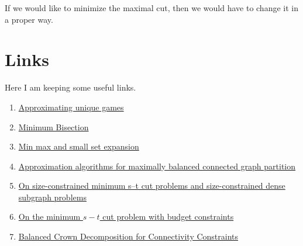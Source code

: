 \documentclass{article}
\theoremstyle{plain}
\theoremstyle{plain}
\theoremstyle{remark}
\begin{document}
	If we would like to minimize the maximal cut, then we would have to change it in a proper way.
	
	\section{Links}
	
	Here I am keeping some useful links.
	
	\begin{enumerate}
		\item \href{https://www.semanticscholar.org/paper/Approximating-unique-games-Gupta-Talwar/a90ecfd407e1730c9039fdc46e7efefcc46dcfda}{Approximating unique games}
		\item \href{https://www.khoury.northeastern.edu/home/austin/papers/bisection.pdf}{Minimum Bisection}
		\item \href{https://epubs.siam.org/doi/abs/10.1137/120873996}{Min max and small set expansion}
		\item \href{https://link.springer.com/article/10.1007/s00453-021-00870-3}{Approximation algorithms for maximally balanced connected graph partition}
		\item \href{https://www.sciencedirect.com/science/article/pii/S0304397515009378}{On size-constrained minimum s–t cut problems and size-constrained dense subgraph problems}
		\item \href{https://link.springer.com/article/10.1007/s10107-023-01987-9}{On the minimum $s-t$ cut problem with budget constraints}
		\item \href{https://drops.dagstuhl.de/entities/document/10.4230/LIPIcs.ESA.2021.26}{Balanced Crown Decomposition for Connectivity Constraints}
	\end{enumerate}
	
\end{document}
